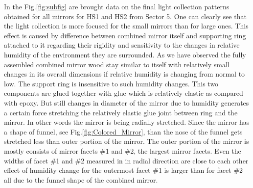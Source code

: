In the Fig.\ref{fig:subfig} are brought data on the final light collection patterns obtained for all mirrors for HS1 and HS2 from Sector 5. One can clearly see that the light collection is more focused for the small mirrors than for large ones. This effect is caused by difference between combined mirror itself and supporting ring attached to it regarding their rigidity and sensitivity to the changes in relative humidity of the environment they are surrounded. As we have observed the fully assembled combined mirror wood stay similar to itself with relatively small changes in its overall dimensions  if relative humidity is changing from normal to low. The support ring is insensitive to such humidity changes. This two components are glued together with glue which is relatively elastic as compared with epoxy. But still changes in diameter of the mirror due to humidity generates a certain force stretching the relatively elastic glue joint between ring and the mirror. In other words the mirror is being radially stretched. Since the mirror has a shape of funnel, see Fig.\ref{fig:Colored_Mirror}, than the nose of the funnel gets stretched less than outer portion of the mirror. The outer portion of the mirror is mostly consists of mirror facets \#1 and \#2, the largest mirror facets. Even the widths of facet \#1 and \#2 measured in in radial direction are close to each other effect of humidity change for the outermost facet \#1 is larger than for facet \#2 all due to the funnel shape of the combined mirror.

